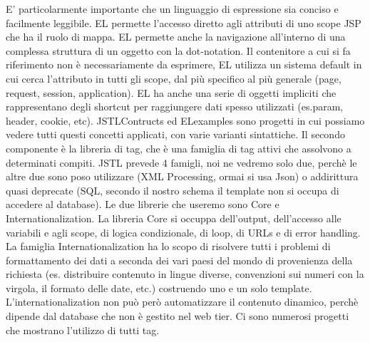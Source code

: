 E' particolarmente importante che un linguaggio di espressione sia conciso e facilmente leggibile. EL permette l'accesso diretto agli attributi di uno scope JSP che ha il ruolo di mappa. EL permette anche la navigazione all'interno di una complessa struttura di un oggetto con la dot-notation.\newline
Il contenitore a cui si fa riferimento non è necessariamente da esprimere, EL utilizza un sistema default in cui cerca l'attributo in tutti gli scope, dal più specifico al più generale (page, request, session, application).\newline
EL ha anche una serie di oggetti impliciti che rappresentano degli shortcut per raggiungere dati spesso utilizzati (es.param, header, cookie, etc).\newline
\newline
JSTLContructs ed ELexamples sono progetti in cui possiamo vedere tutti questi concetti applicati, con varie varianti sintattiche.\newline
\newline
Il secondo componente è la libreria di tag, che è una famiglia di tag attivi che assolvono a determinati compiti. JSTL prevede 4 famigli, noi ne vedremo solo due, perchè le altre due sono poso utilizzare (XML Processing, ormai si usa Json) o addirittura quasi deprecate (SQL, secondo il nostro schema il template non si occupa di accedere al database). Le due librerie che useremo sono Core e Internationalization.\newline
La libreria Core si occuppa dell'output, dell'accesso alle variabili e agli scope, di logica condizionale, di loop, di URLs e di error handling.\newline
La famiglia Internationalization ha lo scopo di risolvere tutti i problemi di formattamento dei dati a seconda dei vari paesi del mondo di provenienza della richiesta (es. distribuire contenuto in lingue diverse, convenzioni sui numeri con la virgola, il formato delle date, etc.) costruendo uno e un solo template. L'internationalization non può però automatizzare il contenuto dinamico, perchè dipende dal database che non è gestito nel web tier.\newline
\newline
Ci sono numerosi progetti che mostrano l'utilizzo di tutti tag.\newline
\newline
